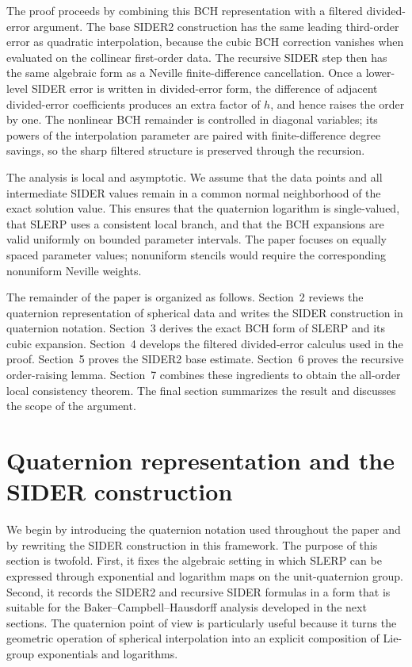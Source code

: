 \documentclass[a4paper,11pt]{article}
\numberwithin{equation}{section}
\theoremstyle{plain}
\theoremstyle{definition}
\theoremstyle{remark}
\begin{document}
The proof proceeds by combining this BCH representation with a filtered
divided-error argument.  The base SIDER2 construction has the same leading
third-order error as quadratic interpolation, because the cubic BCH correction
vanishes when evaluated on the collinear first-order data.  The recursive
SIDER step then has the same algebraic form as a Neville finite-difference
cancellation.  Once a lower-level SIDER error is written in divided-error form,
the difference of adjacent divided-error coefficients produces an extra factor
of \(h\), and hence raises the order by one.  The nonlinear BCH remainder is
controlled in diagonal variables; its powers of the interpolation parameter are
paired with finite-difference degree savings, so the sharp filtered structure
is preserved through the recursion.

The analysis is local and asymptotic.  We assume that the data points and all
intermediate SIDER values remain in a common normal neighborhood of the exact
solution value.  This ensures that the quaternion logarithm is single-valued,
that SLERP uses a consistent local branch, and that the BCH expansions are
valid uniformly on bounded parameter intervals.  The paper focuses on equally
spaced parameter values; nonuniform stencils would require the corresponding
nonuniform Neville weights.

The remainder of the paper is organized as follows.  Section~2 reviews the
quaternion representation of spherical data and writes the SIDER construction
in quaternion notation.  Section~3 derives the exact BCH form of SLERP and its
cubic expansion.  Section~4 develops the filtered divided-error calculus used
in the proof.  Section~5 proves the SIDER2 base estimate.  Section~6 proves
the recursive order-raising lemma.  Section~7 combines these ingredients to
obtain the all-order local consistency theorem.  The final section summarizes
the result and discusses the scope of the argument.

\section{Quaternion representation and the SIDER construction}

We begin by introducing the quaternion notation used throughout the paper and
by rewriting the SIDER construction in this framework.  The purpose of this
section is twofold.  First, it fixes the algebraic setting in which SLERP can
be expressed through exponential and logarithm maps on the unit-quaternion
group.  Second, it records the SIDER2 and recursive SIDER formulas in a form
that is suitable for the Baker--Campbell--Hausdorff analysis developed in the
next sections.  The quaternion point of view is particularly useful because it
turns the geometric operation of spherical interpolation into an explicit
composition of Lie-group exponentials and logarithms.
\end{document}
